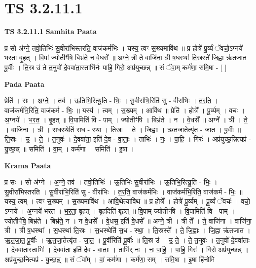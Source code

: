 \documentclass[17pt]{extarticle}
\begin{document}
\section{ TS 3.2.11.1 }

\textbf{TS 3.2.11.1 } \newline
\textbf{Samhita Paata} \newline

प्र सो अ॑ग्ने॒ तवो॒तिभिः॑ सु॒वीरा॑भिस्तरति॒ वाज॑कर्मभिः । यस्य॒ त्वꣳ स॒ख्यमावि॑थ ॥ प्र होत्रे॑ पू॒र्व्यं ॅवचो॒ऽग्नये॑ भरता बृ॒हत् । वि॒पां ज्योतीꣳ॑षि॒ बिभ्र॑ते॒ न वे॒धसे᳚ ॥ अग्ने॒ त्री ते॒ वाजि॑ना॒ त्री ष॒धस्था॑ ति॒स्रस्ते॑ जि॒ह्वा ऋ॑तजात पू॒र्वीः । ति॒स्र उ॑ ते त॒नुवो॑ दे॒ववा॑ता॒स्ताभि॑र्नः पाहि॒ गिरो॒ अप्र॑युच्छन्न् ॥ सं ॅवा॒म् कर्म॑णा॒ समि॒षा - [  ] \newline

\textbf{Pada Paata} \newline

प्रेति॑ । सः । अ॒ग्ने॒ । तव॑ । ऊ॒तिभि॒रित्यू॒ति - भिः॒ । सु॒वीरा॑भि॒रिति॑ सु - वीरा॑भिः । त॒र॒ति॒ । वाज॑कर्मभि॒रिति॒ वाज॑कर्म - भिः॒ ॥ यस्य॑ । त्वम् । स॒ख्यम् । आवि॑थ ॥ प्रेति॑ । होत्रे᳚ । पू॒र्व्यम् । वचः॑ । अ॒ग्नये᳚ । भ॒र॒त॒ । बृ॒हत् ॥ वि॒पामिति॑ वि - पाम् । ज्योतीꣳ॑षि । बिभ्र॑ते । न । वे॒धसे᳚ ॥ अग्ने᳚ । त्री । ते॒ । वाजि॑ना । त्री । स॒धस्थेति॑ स॒ध - स्था॒ । ति॒स्रः । ते॒ । जि॒ह्वाः । ऋ॒त॒जा॒तेत्यृ॑त - जा॒त॒ । पू॒र्वीः ॥ ति॒स्रः । उ॒ । ते॒ । त॒नुवः॑ । दे॒ववा॑ता॒ इति॑ दे॒व - वा॒ताः॒ । ताभिः॑ । नः॒ । पा॒हि॒ । गिरः॑ । अप्र॑युच्छ॒न्नित्यप्र॑ - यु॒च्छ॒न्न् ॥ समिति॑ । वा॒म् । कर्म॑णा । समिति॑ । इ॒षा ।  \newline


\textbf{Krama Paata} \newline

प्र सः । सो अ॑ग्ने । अ॒ग्ने॒ तव॑ । तवो॒तिभिः॑ । ऊ॒तिभिः॑ सु॒वीरा॑भिः । ऊ॒तिभि॒रित्यू॒ति - भिः॒ । सु॒वीरा॑भिस्तरति । सु॒वीरा॑भि॒रिति॑ सु - वीरा॑भिः । त॒र॒ति॒ वाज॑कर्मभिः । वाज॑कर्मभि॒रिति॒ वाज॑कर्म - भिः॒ ॥ यस्य॒ त्वम् । त्वꣳ स॒ख्यम् । स॒ख्यमावि॑थ । आवि॒थेत्यावि॑थ ॥ प्र होत्रे᳚ । होत्रे॑ पू॒र्व्यम् । पू॒र्व्यं ॅवचः॑ । वचो॒ ऽग्नये᳚ । अ॒ग्नये॑ भरत । भ॒र॒ता॒ बृ॒हत् । बृ॒हदिति॑ बृ॒हत् ॥ वि॒पाम् ज्योतीꣳ॑षि । वि॒पामिति॑ वि - पाम् । ज्योतीꣳ॑षि॒ बिभ्र॑ते । बिभ्र॑ते॒ न । न वे॒धसे᳚ । वे॒धस॒ इति॑ वे॒धसे᳚ ॥ अग्ने॒ त्री । त्री ते᳚ । ते॒ वाजि॑ना । वाजि॑ना॒ त्री । त्री ष॒धस्था᳚ । स॒धस्था॑ ति॒स्रः । स॒धस्थेति॑ स॒ध - स्था॒ । ति॒स्रस्ते᳚ । ते॒ जि॒ह्वाः । जि॒ह्वा ऋ॑तजात । ऋ॒त॒जा॒त॒ पू॒र्वीः । ऋ॒त॒जा॒तेत्यृ॑त - जा॒त॒ । पू॒र्वीरिति॑ पू॒र्वीः ॥ ति॒स्र उ॑ । उ॒ ते॒ । ते॒ त॒नुवः॑ । त॒नुवो॑ दे॒ववा॑ताः । दे॒ववा॑ता॒स्ताभिः॑ । दे॒ववा॑ता॒ इति॑ दे॒व - वा॒ताः॒ । ताभि॑र् नः । नः॒ पा॒हि॒ । पा॒हि॒ गिरः॑ । गिरो॒ अप्र॑युच्छन्न् । अप्र॑युच्छ॒नित्यप्र॑ - यु॒च्छ॒न्न्॒ ॥ सं ॅवा᳚म् । वां॒ कर्म॑णा । कर्म॑णा॒ सम् । समि॒षा । इ॒षा हि॑नोमि \newline
\end{document}
